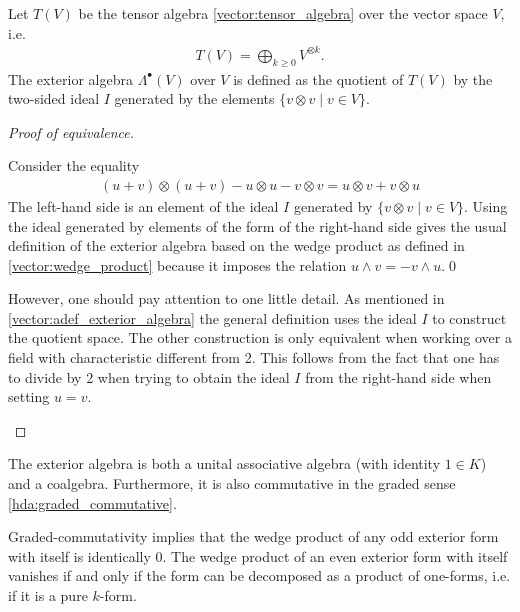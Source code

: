     \begin{adefinition}\label{vector:adef_exterior_algebra}
        Let $T(V)$ be the tensor algebra \ref{vector:tensor_algebra} over the vector space $V$, i.e.
        \begin{gather}
            T(V) = \bigoplus_{k\geq0}V^{\otimes k}.
        \end{gather}
        The exterior algebra $\Lambda^\bullet(V)$ over $V$ is defined as the quotient of $T(V)$ by the two-sided ideal $I$ generated by the elements $\{v\otimes v\mid v\in V\}$.\\
        \begin{proof}[Proof of equivalence]
            \begin{mdframed}[roundcorner=10pt, linecolor=blue, linewidth=1pt]
                Consider the equality
                \begin{gather}
                    (u+v)\otimes(u+v) - u\otimes u - v\otimes v = u\otimes v + v\otimes u
                \end{gather}
                The left-hand side is an element of the ideal $I$ generated by $\{v\otimes v\mid v\in V\}$. Using the ideal generated by elements of the form of the right-hand side gives the usual definition of the exterior algebra based on the wedge product as defined in \ref{vector:wedge_product} because it imposes the relation $u\wedge v = -v\wedge u$.\qed

                However, one should pay attention to one little detail. As mentioned in \ref{vector:adef_exterior_algebra} the general definition uses the ideal $I$ to construct the quotient space. The other construction is only equivalent when working over a field with characteristic different from 2. This follows from the fact that one has to divide by 2 when trying to obtain the ideal $I$ from the right-hand side when setting $u=v$.
            \end{mdframed}
        \end{proof}
    \end{adefinition}

    \begin{property}
        The exterior algebra is both a unital associative algebra (with identity $1\in K$) and a coalgebra. Furthermore, it is also commutative in the graded sense \ref{hda:graded_commutative}.
    \end{property}

    \begin{property}[Nilpotency]
        Graded-commutativity implies that the wedge product of any odd exterior form with itself is identically 0. The wedge product of an even exterior form with itself vanishes if and only if the form can be decomposed as a product of one-forms, i.e. if it is a pure $k$-form.
    \end{property}

